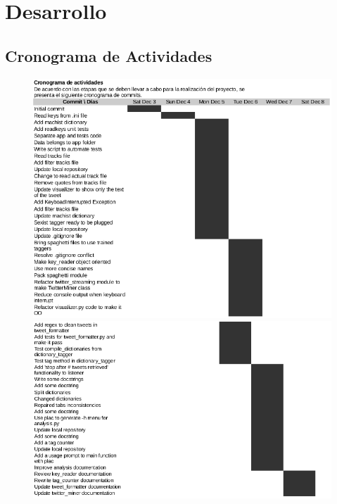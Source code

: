 \documentclass{article}
\begin{document}
\section{Desarrollo}
\subsection{Cronograma de Actividades}
\begin{figure}[H]
\includegraphics[scale=0.5]{crono1.png}
\includegraphics[scale=0.5]{crono2.png}
\end{figure}















\end{document}
